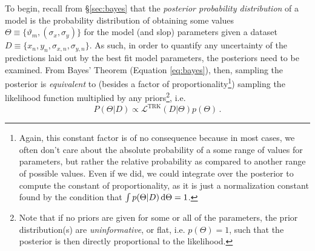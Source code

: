 To begin, recall from \S\ref{sec:bayes} that the \textit{posterior probability distribution} of a model is the probability distribution of obtaining some values $\Theta\equiv\{\vartheta_m,(\sigma_x,\sigma_y)\}$ for the model (and slop) parameters given a dataset $D\equiv\{x_n,y_n,\sigma_{x,n},\sigma_{y,n}\}$. As such, in order to quantify any uncertainty of the predictions laid out by the best fit model parameters, the posteriors need to be examined. From Bayes' Theorem (Equation \eqref{eq:bayes}), then, sampling the posterior is \textit{equivalent} to (besides a factor of proportionality\footnote{Again, this constant factor is of no consequence because in most cases, we often don't care about the absolute probability of a some range of values for parameters, but rather the relative probability as compared to another range of possible values. Even if we did, we could integrate over the posterior to compute the constant of proportionality, as it is just a normalization constant found by the condition that $\int p(\Theta|D)\mathop{}\!\mathrm{d} \Theta=1$.}) sampling the likelihood function multiplied by any priors\footnote{Note that if no priors are given for some or all of the parameters, the prior distribution(s) are \textit{uninformative}, or flat, i.e. $p(\Theta)=1$, such that the posterior is then directly proportional to the likelihood.}, i.e.
\begin{equation}
     P(\Theta|D)\propto\mathcal{L}^\text{TRK}(D|\Theta)p(\Theta)\,.
\end{equation}
